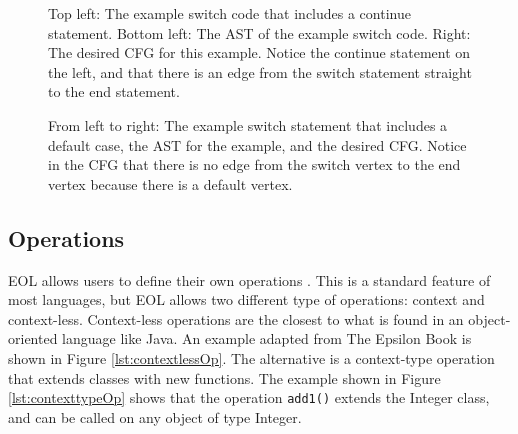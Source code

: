 \begin{figure}
\centering
\begin{minipage}{.6\textwidth}
  \centering
  
\end{minipage}%
\begin{minipage}{.3\textwidth}
  \centering
\end{minipage}
\caption{Top left: The example switch code that includes a continue statement. Bottom left: The AST of the example switch code. Right: The desired CFG for this example. Notice the continue statement on the left, and that there is an edge from the switch statement straight to the end statement.}
\label{fig:switch1}
\end{figure}

\begin{figure}
\centering
\begin{minipage}{.3\textwidth}
  \centering
  
\end{minipage}%
\begin{minipage}{.3\textwidth}
  \centering
\end{minipage}
\begin{minipage}{.3\textwidth}
  \centering
\end{minipage}
\caption{From left to right: The example switch statement that includes a default case, the AST for the example, and the desired CFG. Notice in the CFG that there is no edge from the switch vertex to the end vertex because there is a default vertex.}
\label{fig:switch2}
\end{figure}

\subsection{Operations}

EOL allows users to define their own operations \citep{epsilonBook}. This is a standard feature of most languages, but EOL allows two different type of operations: context and context-less. Context-less operations are the closest to what is found in an object-oriented language like Java. An example adapted from The Epsilon Book \citet{epsilonBook} is shown in Figure \ref{lst:contextlessOp}. The alternative is a context-type operation that extends classes with new functions. The example shown in Figure \ref{lst:contexttypeOp} shows that the operation \verb|add1()| extends the Integer class, and can be called on any object of type Integer.

